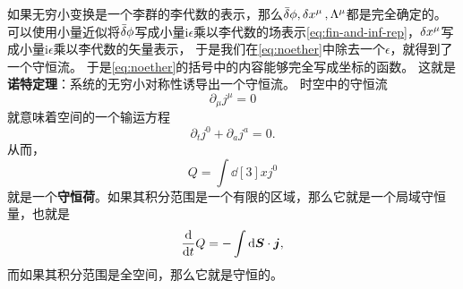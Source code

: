 \documentclass[UTF8, a4paper]{ctexart}
\newcommand*{\ii}{\mathrm{i}}
\begin{document}
如果无穷小变换是一个李群的李代数的表示，那么$\bar{\var}{\phi},\var{x^\mu}, \Lambda^\mu$都是完全确定的。可以使用小量近似将$\bar{\var}{\phi}$写成小量$ \ii \epsilon$乘以李代数的场表示\eqref{eq:fin-and-inf-rep}，$\var{x^\mu}$写成小量$\ii \epsilon$乘以李代数的矢量表示，
于是我们在\eqref{eq:noether}中除去一个$\epsilon$，就得到了一个守恒流。
于是\eqref{eq:noether}的括号中的内容能够完全写成坐标的函数。
这就是\textbf{诺特定理}：系统的无穷小对称性诱导出一个守恒流。
时空中的守恒流
\begin{equation}
    \partial_\mu j^\mu = 0
\end{equation}
就意味着空间的一个输运方程
\begin{equation}
    \partial_t j^0 + \partial_a j^a = 0.
\end{equation}
从而，
\begin{equation}
    Q = \int \dd[3]x j^0
\end{equation}
就是一个\textbf{守恒荷}。如果其积分范围是一个有限的区域，那么它就是一个局域守恒量，也就是
\[
    \dv{t} Q = - \int \dd{\vb*{S}} \cdot \vb*{j},
\]
而如果其积分范围是全空间，那么它就是守恒的。
\end{document}
